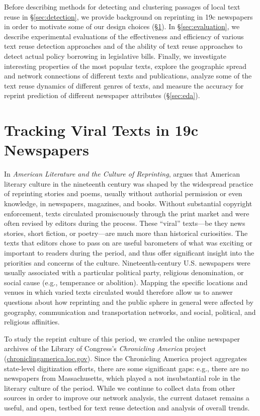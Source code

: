 \documentclass[pdftex,11pt]{article}
\begin{document}
Before describing methods for detecting and clustering passages of
local text reuse in \S\ref{sec:detection}, we provide background on
reprinting in 19c newspapers in order to motivate some of our design
choices (\S\ref{sec:tracking-newspapers}).  In \S\ref{sec:evaluation}, we
describe experimental evaluations of the effectiveness and efficiency
of various text reuse detection approaches and of the ability of text
reuse approaches to detect actual policy borrowing in legislative
bills.  Finally, we investigate interesting properties of the most
popular texts, explore the geographic spread and network connections
of different texts and publications, analyze some of the text reuse
dynamics of different genres of texts, and measure the accuracy for
reprint prediction of different newspaper attributes
(\S\ref{sec:eda}).

\section{Tracking Viral Texts in 19c Newspapers}
\label{sec:tracking-newspapers}

In \emph{American Literature and the Culture of Reprinting},
\citet{mcgill03:_americ_liter_cultur_reprin} argues that American
literary culture in the nineteenth century was shaped by the
widespread practice of reprinting stories and poems, usually without
authorial permission or even knowledge, in newspapers, magazines, and
books.  Without substantial copyright enforcement, texts circulated
promiscuously through the print market and were often revised by
editors during the process.  These ``viral'' texts---be they news
stories, short fiction, or poetry---are much more than historical
curiosities.  The texts that editors chose to pass on are useful
barometers of what was exciting or important to readers during the
period, and thus offer significant insight into the priorities and
concerns of the culture.  Nineteenth-century U.S. newspapers were
usually associated with a particular political party, religious
denomination, or social cause (e.g., temperance or abolition).
Mapping the specific locations and venues in which varied texts
circulated would therefore allow us to answer questions about how
reprinting and the public sphere in general were affected by
geography, communication and transportation networks, and social,
political, and religious affinities.

To study the reprint culture of this period, we crawled the online
newspaper archives of the Library of Congress's \emph{Chronicling
  America} project (\url{chroniclingamerica.loc.gov}).  Since the
Chronicling America project aggregates state-level digitization
efforts, there are some significant gaps: e.g., there are no
newspapers from Massachusetts, which played a not insubstantial role
in the literary culture of the period.  While we continue to collect
data from other sources in order to improve our network analysis, the
current dataset remains a useful, and open, testbed for text reuse
detection and analysis of overall trends.
\end{document}
